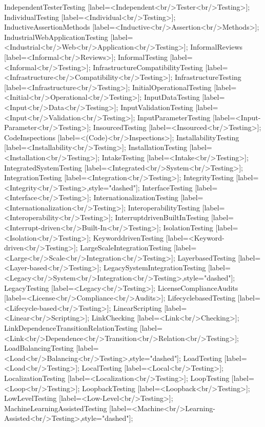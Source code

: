 \documentclass{article}
\begin{document}
{IndependentTesterTesting [label=<Independent<br/>Tester<br/>Testing>];
IndividualTesting [label=<Individual<br/>Testing>];
InductiveAssertionMethods [label=<Inductive<br/>Assertion<br/>Methods>];
IndustrialWebApplicationTesting [label=<Industrial<br/>Web<br/>Application<br/>Testing>];
InformalReviews [label=<Informal<br/>Reviews>];
InformalTesting [label=<Informal<br/>Testing>];
InfrastructureCompatibilityTesting [label=<Infrastructure<br/>Compatibility<br/>Testing>];
InfrastructureTesting [label=<Infrastructure<br/>Testing>];
InitialOperationalTesting [label=<Initial<br/>Operational<br/>Testing>];
InputDataTesting [label=<Input<br/>Data<br/>Testing>];
InputValidationTesting [label=<Input<br/>Validation<br/>Testing>];
InputParameterTesting [label=<Input-Parameter<br/>Testing>];
InsourcedTesting [label=<Insourced<br/>Testing>];
CodeInspections [label=<(Code)<br/>Inspections>];
InstallabilityTesting [label=<Installability<br/>Testing>];
InstallationTesting [label=<Installation<br/>Testing>];
IntakeTesting [label=<Intake<br/>Testing>];
IntegratedSystemTesting [label=<Integrated<br/>System<br/>Testing>];
IntegrationTesting [label=<Integration<br/>Testing>];
IntegrityTesting [label=<Integrity<br/>Testing>,style="dashed"];
InterfaceTesting [label=<Interface<br/>Testing>];
InternationalizationTesting [label=<Internationalization<br/>Testing>];
InteroperabilityTesting [label=<Interoperability<br/>Testing>];
InterruptdrivenBuiltInTesting [label=<Interrupt-driven<br/>Built-In<br/>Testing>];
IsolationTesting [label=<Isolation<br/>Testing>];
KeyworddrivenTesting [label=<Keyword-driven<br/>Testing>];
LargeScaleIntegrationTesting [label=<Large<br/>Scale<br/>Integration<br/>Testing>];
LayerbasedTesting [label=<Layer-based<br/>Testing>];
LegacySystemIntegrationTesting [label=<Legacy<br/>System<br/>Integration<br/>Testing>,style="dashed"];
LegacyTesting [label=<Legacy<br/>Testing>];
LicenseComplianceAudits [label=<License<br/>Compliance<br/>Audits>];
LifecyclebasedTesting [label=<Lifecycle-based<br/>Testing>];
LinearScripting [label=<Linear<br/>Scripting>];
LinkChecking [label=<Link<br/>Checking>];
LinkDependenceTransitionRelationTesting [label=<Link<br/>Dependence<br/>Transition<br/>Relation<br/>Testing>];
LoadBalancingTesting [label=<Load<br/>Balancing<br/>Testing>,style="dashed"];
LoadTesting [label=<Load<br/>Testing>];
LocalTesting [label=<Local<br/>Testing>];
LocalizationTesting [label=<Localization<br/>Testing>];
LoopTesting [label=<Loop<br/>Testing>];
LoopbackTesting [label=<Loopback<br/>Testing>];
LowLevelTesting [label=<Low-Level<br/>Testing>];
MachineLearningAssistedTesting [label=<Machine<br/>Learning-Assisted<br/>Testing>,style="dashed"];
}
\end{document}
